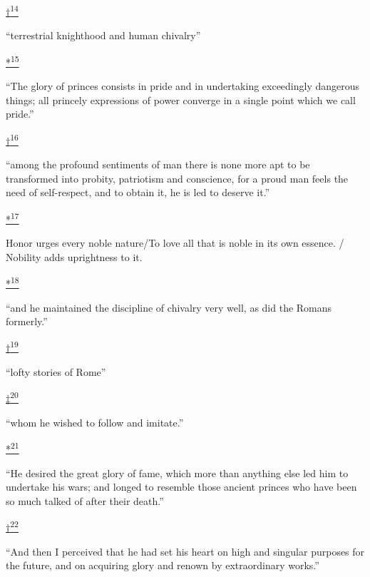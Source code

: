 \protect\hypertarget{23_NOTES.xhtmlux5cux23id_2490}{\protect\hyperlink{10_Chapter_Three__THE_HEROIC_DREAM.xhtmlux5cux23id_2489}{†\textsuperscript{14}}}
``terrestrial knighthood and human chivalry''

\protect\hypertarget{23_NOTES.xhtmlux5cux23id_2492}{\protect\hyperlink{10_Chapter_Three__THE_HEROIC_DREAM.xhtmlux5cux23id_2491}{*\textsuperscript{15}}}
``The glory of princes consists in pride and in undertaking exceedingly
dangerous things; all princely expressions of power converge in a single
point which we call pride.''

\protect\hypertarget{23_NOTES.xhtmlux5cux23id_2494}{\protect\hyperlink{10_Chapter_Three__THE_HEROIC_DREAM.xhtmlux5cux23id_2493}{†\textsuperscript{16}}}
``among the profound sentiments of man there is none more apt to be
transformed into probity, patriotism and conscience, for a proud man
feels the need of self-respect, and to obtain it, he is led to deserve
it.''

\protect\hypertarget{23_NOTES.xhtmlux5cux23id_2496}{\protect\hyperlink{10_Chapter_Three__THE_HEROIC_DREAM.xhtmlux5cux23id_2495}{*\textsuperscript{17}}}
Honor urges every noble nature/To love all that is noble in its own
essence. / Nobility adds uprightness to it.

\protect\hypertarget{23_NOTES.xhtmlux5cux23id_2498}{\protect\hyperlink{10_Chapter_Three__THE_HEROIC_DREAM.xhtmlux5cux23id_2497}{*\textsuperscript{18}}}
``and he maintained the discipline of chivalry very well, as did the
Romans formerly.''

\protect\hypertarget{23_NOTES.xhtmlux5cux23id_2502}{\protect\hyperlink{10_Chapter_Three__THE_HEROIC_DREAM.xhtmlux5cux23id_2501}{†\textsuperscript{19}}}
``lofty stories of Rome''

\protect\hypertarget{23_NOTES.xhtmlux5cux23id_2500}{\protect\hyperlink{10_Chapter_Three__THE_HEROIC_DREAM.xhtmlux5cux23id_2499}{‡\textsuperscript{20}}}
``whom he wished to follow and imitate.''

\protect\hypertarget{23_NOTES.xhtmlux5cux23id_2504}{\protect\hyperlink{10_Chapter_Three__THE_HEROIC_DREAM.xhtmlux5cux23id_2503}{*\textsuperscript{21}}}
``He desired the great glory of fame, which more than anything else led
him to undertake his wars; and longed to resemble those ancient princes
who have been so much talked of after their death.''

\protect\hypertarget{23_NOTES.xhtmlux5cux23id_2506}{\protect\hyperlink{10_Chapter_Three__THE_HEROIC_DREAM.xhtmlux5cux23id_2505}{†\textsuperscript{22}}}
``And then I perceived that he had set his heart on high and singular
purposes for the future, and on acquiring glory and renown by
extraordinary works.''

